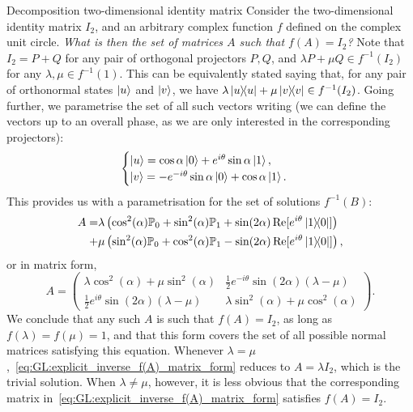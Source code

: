 \begin{examplebox}[label={ex:GL:solutions_f(A)=I2}]{Decomposition two-dimensional identity matrix}
Consider the two-dimensional identity matrix $I_2$, and an arbitrary complex function $f$ defined on the complex unit circle. \emph{What is then the set of matrices $A$ such that $f(A)=I_2$?}
Note that $I_2=P+Q$ for any pair of orthogonal projectors $P,Q$, and $\lambda P + \mu Q\in f^{-1}(I_2)$ for any $\lambda,\mu\in f^{-1}(1)$.
This can be equivalently stated saying that, for any pair of orthonormal states $\ket u$ and $\ket v$, we have
$\lambda \ketbra u + \mu \ketbra v\in f^{-1}(I_2)$.
Going further, we parametrise the set of all such vectors writing (we can define the vectors up to an overall phase, as we are only interested in the corresponding projectors):
\begin{equation}
    \begin{cases}
    \ket u =\cos\alpha\ket 0+e^{i\theta}\sin\alpha \ket 1, \\
    \ket v =-e^{-i\theta}\sin\alpha\ket 0 + \cos\alpha\ket 1.
\end{cases}
\end{equation}
This provides us with a parametrisation for the set of solutions $f^{-1}(B)$:
\begin{equation}
\begin{aligned}
    A = &\lambda\left(\cos^2(\alpha) \mathbb{P}_0 + \sin^2(\alpha) \mathbb{P}_1 + \sin(2\alpha)\operatorname{Re}[e^{i\theta}\ketbra{1}{0}]\right) \\
    +&\mu\left(
        \sin^2(\alpha) \mathbb{P}_0 + \cos^2(\alpha) \mathbb{P}_1 - \sin(2\alpha)\operatorname{Re}[e^{i\theta}\ketbra{1}{0}]
    \right),
\end{aligned}
\end{equation}
or in matrix form,
\begin{equation}
    A = \begin{pmatrix}
        \lambda \cos^2(\alpha)+\mu\sin^2(\alpha) &
        \frac12 e^{-i\theta} \sin(2\alpha) (\lambda-\mu) \\ 
        \frac12 e^{i\theta} \sin(2\alpha) (\lambda-\mu) &
        \lambda \sin^2(\alpha)+\mu\cos^2(\alpha)
    \end{pmatrix}.
    \label{eq:GL:explicit_inverse_f(A)_matrix_form}
\end{equation}
We conclude that any such $A$ is such that $f(A)=I_2$, as long as $f(\lambda)=f(\mu)=1$, and that this form covers the set of all possible normal matrices satisfying this equation.
Whenever $\lambda=\mu$,~\cref{eq:GL:explicit_inverse_f(A)_matrix_form} reduces to $A=\lambda I_2$, which is the trivial solution. When $\lambda\neq\mu$, however, it is less obvious that the corresponding matrix in~\cref{eq:GL:explicit_inverse_f(A)_matrix_form} satisfies $f(A)=I_2$.

\end{examplebox}
